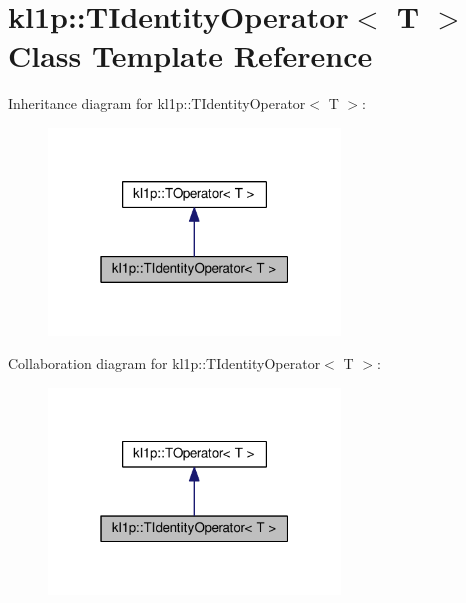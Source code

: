 \hypertarget{classkl1p_1_1TIdentityOperator}{}\section{kl1p\+:\+:T\+Identity\+Operator$<$ T $>$ Class Template Reference}
\label{classkl1p_1_1TIdentityOperator}


Inheritance diagram for kl1p\+:\+:T\+Identity\+Operator$<$ T $>$\+:
\nopagebreak
\begin{figure}[H]
\begin{center}
\leavevmode
\includegraphics[width=220pt]{classkl1p_1_1TIdentityOperator__inherit__graph}
\end{center}
\end{figure}


Collaboration diagram for kl1p\+:\+:T\+Identity\+Operator$<$ T $>$\+:
\nopagebreak
\begin{figure}[H]
\begin{center}
\leavevmode
\includegraphics[width=220pt]{classkl1p_1_1TIdentityOperator__coll__graph}
\end{center}
\end{figure}
